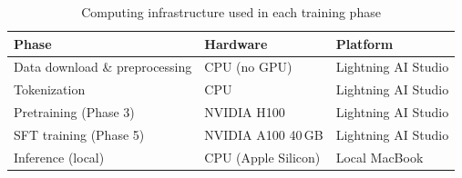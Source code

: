 \documentclass[12pt]{article}
\begin{document}
\begin{table}[H]
  \centering
  \caption{Computing infrastructure used in each training phase}
  \begin{tabular}{L{3.5cm} L{4.0cm} L{4.5cm}}
    \toprule
    \textbf{Phase} & \textbf{Hardware} & \textbf{Platform} \\
    \midrule
    Data download \& preprocessing & CPU (no GPU) & Lightning AI Studio \\
    Tokenization & CPU & Lightning AI Studio \\
    Pretraining (Phase 3) & NVIDIA H100 & Lightning AI Studio \\
    SFT training (Phase 5) & NVIDIA A100 40\,GB & Lightning AI Studio \\
    Inference (local) & CPU (Apple Silicon) & Local MacBook \\
    \bottomrule
  \end{tabular}
\end{table}


\end{document}
